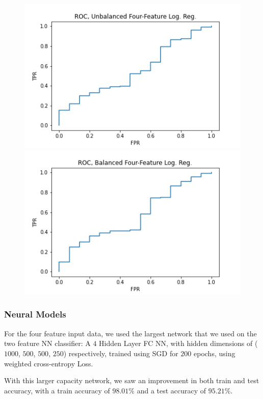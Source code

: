 \documentclass{article}
\begin{document}
\begin{figure}[htb]%
    \centering
    {{\includegraphics[scale=0.4]{unbalancedroc} }}%
    \qquad
    {{\includegraphics[scale=0.4]{balancedroc} }}%
    \label{fig:example}%
\end{figure}

\subsubsection{Neural Models}

For the four feature input data, we used the largest network that we used on the two feature NN classifier: A $4$ Hidden Layer FC NN, with hidden dimensions of ($1000$, $500$, $500$, $250$) respectively, trained using SGD for $200$ epochs, using weighted cross-entropy Loss. 

With this larger capacity network, we saw an improvement in both train and test accuracy, with a train accuracy of $98.01\%$ and a test accuracy of $95.21\%$.
\end{document}
